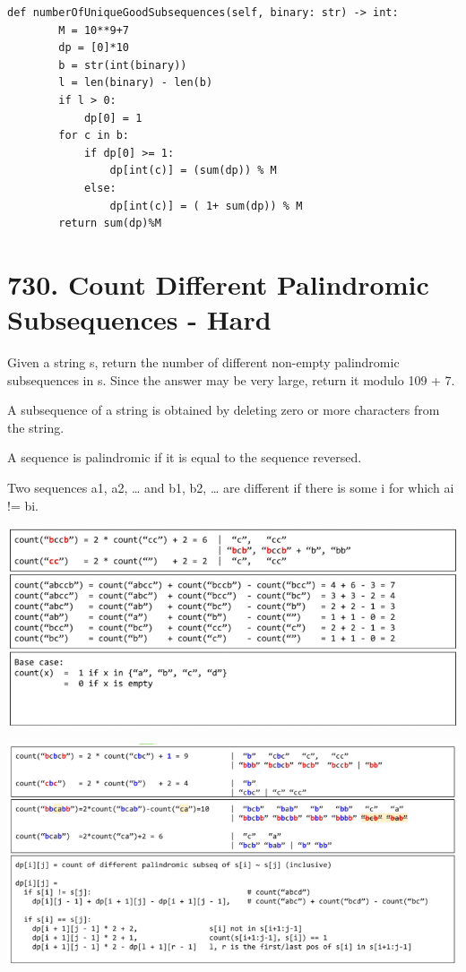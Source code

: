 \documentclass[9pt, b5paaper]{book}
\begin{document}
\begin{verbatim}
def numberOfUniqueGoodSubsequences(self, binary: str) -> int:
        M = 10**9+7
        dp = [0]*10
        b = str(int(binary))
        l = len(binary) - len(b)
        if l > 0:
            dp[0] = 1
        for c in b:
            if dp[0] >= 1:
                dp[int(c)] = (sum(dp)) % M
            else:
                dp[int(c)] = ( 1+ sum(dp)) % M
        return sum(dp)%M
\end{verbatim}
\section{730. Count Different Palindromic Subsequences - Hard}
\label{sec-2-10}
Given a string s, return the number of different non-empty palindromic subsequences in s. Since the answer may be very large, return it modulo 109 + 7.

A subsequence of a string is obtained by deleting zero or more characters from the string.

A sequence is palindromic if it is equal to the sequence reversed.

Two sequences a1, a2, \ldots{} and b1, b2, \ldots{} are different if there is some i for which ai != bi.

\includegraphics[width=.9\linewidth]{./pic/palindromSubSeq.png}

\includegraphics[width=.9\linewidth]{./pic/palindromSubSeq2.png}
\end{document}
